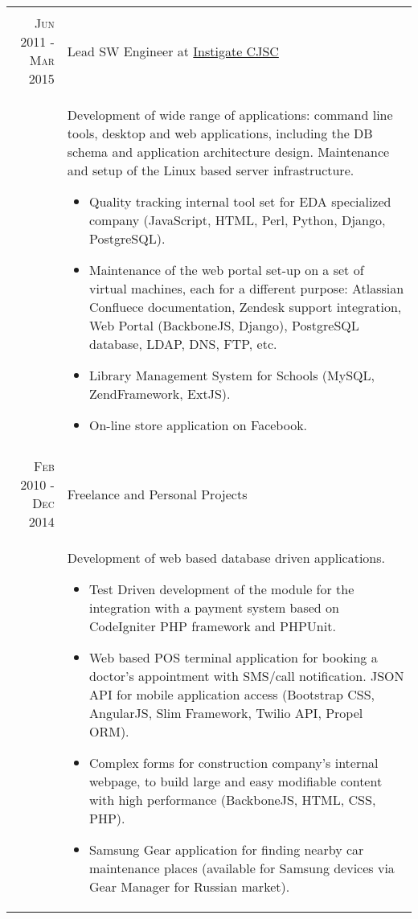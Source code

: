 \documentclass[a4paper,10pt]{article}
\begin{document}
\begin{tabular}{r|p{11cm}}
\multicolumn{2}{c}{} \\


\textsc{Jun 2011 - Mar 2015}
  & Lead SW Engineer at
    \href{http://www.instigatedesign.com/}{Instigate CJSC} \\

& \footnotesize{ Development of wide range of applications: command line tools,
desktop and web applications, including the DB schema and application
architecture design. Maintenance and setup of the Linux based server infrastructure.
  \begin{itemize}
    \item Quality tracking internal tool set for EDA specialized company
      (JavaScript, HTML, Perl, Python, Django, PostgreSQL).
    \item Maintenance of the web portal set-up on a set of virtual machines,
      each for a different purpose: Atlassian Confluece documentation, Zendesk
      support integration, Web Portal (BackboneJS, Django), PostgreSQL
      database, LDAP, DNS, FTP, etc.
    \item Library Management System for Schools (MySQL, ZendFramework, ExtJS).
    \item On-line store application on Facebook.
  \end{itemize}
} \\


\multicolumn{2}{c}{} \\


\textsc{Feb 2010 - Dec 2014}
  & Freelance and Personal Projects \\

& \footnotesize{ Development of web based database driven applications.
  \begin{itemize}
    \item Test Driven development of the module for the integration with a
          payment system based on CodeIgniter PHP framework and PHPUnit.
    \item Web based POS terminal application for booking a doctor's appointment
          with SMS/call notification. JSON API for mobile application access
          (Bootstrap CSS, AngularJS, Slim Framework, Twilio API, Propel ORM).
    \item Complex forms for construction company's internal webpage, to
          build large and easy modifiable content with high performance
          (BackboneJS, HTML, CSS, PHP).
    \item Samsung Gear application for finding nearby car maintenance places
          (available for Samsung devices via Gear Manager for Russian market).
  \end{itemize}
} \\



\end{tabular}
\end{document}
